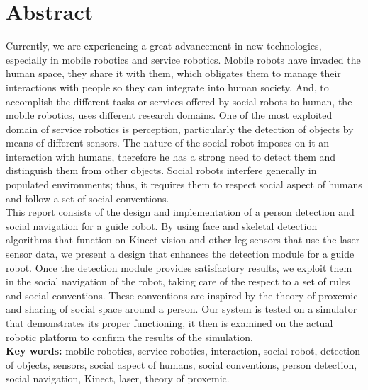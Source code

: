 \chapter*{Abstract}%
\label{Chapter3} %

\tab Currently, we are experiencing a great advancement in new technologies, especially in mobile robotics and service robotics. Mobile robots have invaded the human space, they share it with them, which obligates them to manage their interactions with people so they can integrate into human society.  And, to accomplish the different tasks or services offered by social robots to human, the mobile robotics, uses different research domains. One of the most exploited domain of service robotics is perception, particularly the detection of objects by means of different sensors. The nature of the social robot imposes on it an interaction with humans, therefore he has a strong need to detect them and distinguish them from other objects. Social robots interfere generally in populated environments; thus, it requires them to respect social aspect of humans and follow a set of social conventions. \vspace{5px}\\
\tab This report consists of the design and implementation of a person detection and social navigation for a guide robot. By using face and skeletal detection algorithms that function on Kinect vision and other leg sensors that use the laser sensor data, we present a design that enhances the detection module for a guide robot. Once the detection module provides satisfactory results, we exploit them in the social navigation of the robot, taking care of the respect to a set of rules and social conventions. These conventions are inspired by the theory of proxemic and sharing of social space around a person. Our system is tested on a simulator that demonstrates its proper functioning, it then is examined on the actual robotic platform to confirm the results of the simulation.\vspace{5px}\\
\tab \textbf{Key words: } mobile robotics, service robotics, interaction, social robot, detection of objects, sensors, social aspect of humans, social conventions, person detection, social navigation, Kinect, laser, theory of proxemic.

